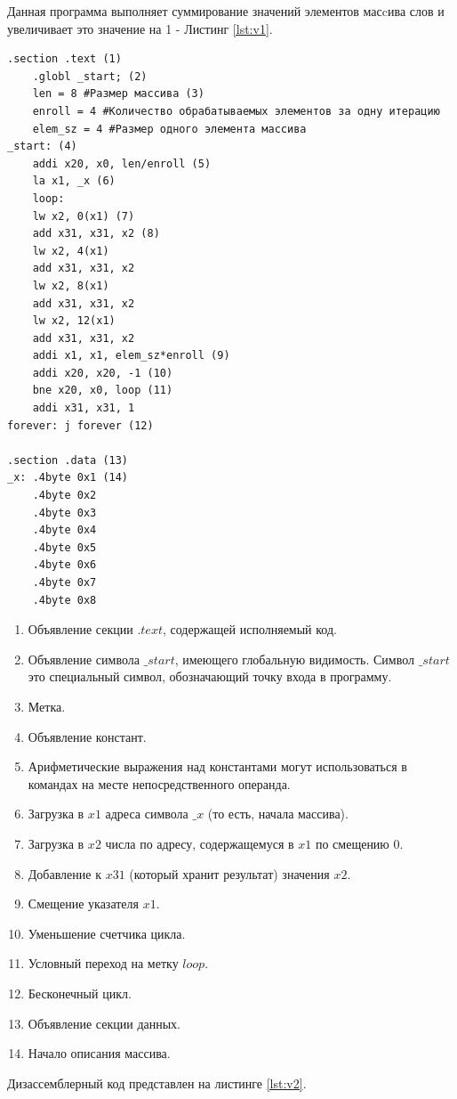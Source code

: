 Данная программа выполняет суммирование значений элементов масcива слов и увеличивает
это значение на 1 - Листинг \ref{lst:v1}.
\begin{lstlisting}[label=lst:v1,caption=Пример программы]
    .section .text (1)
	.globl _start; (2)
	len = 8 #Размер массива (3)
	enroll = 4 #Количество обрабатываемых элементов за одну итерацию
	elem_sz = 4 #Размер одного элемента массива
_start: (4)
	addi x20, x0, len/enroll (5)
	la x1, _x (6)
	loop:
	lw x2, 0(x1) (7)
	add x31, x31, x2 (8)
	lw x2, 4(x1)
	add x31, x31, x2
	lw x2, 8(x1)
	add x31, x31, x2
	lw x2, 12(x1)
	add x31, x31, x2
	addi x1, x1, elem_sz*enroll (9)
	addi x20, x20, -1 (10)
	bne x20, x0, loop (11)
	addi x31, x31, 1
forever: j forever (12)

.section .data (13)
_x: .4byte 0x1 (14)
	.4byte 0x2
	.4byte 0x3
	.4byte 0x4
	.4byte 0x5
	.4byte 0x6
	.4byte 0x7
	.4byte 0x8
\end{lstlisting}

\clearpage

\begin{enumerate}
	\item Объявление секции $.text$, содержащей исполняемый код.
	\item Объявление символа $\_start$, имеющего глобальную видимость. Символ $\_start$ это специальный символ, обозначающий точку входа в программу.
	\item Метка.
	\item Объявление констант.
	\item Арифметические выражения над константами могут использоваться в командах
	на месте непосредственного операнда.
	\item Загрузка в $x1$ адреса символа $\_x$ (то есть, начала массива).
	\item Загрузка в $x2$ числа по адресу, содержащемуся в $x1$ по смещению 0.
	\item Добавление к $x31$ (который хранит результат) значения $x2$.
	\item Смещение указателя $x1$.
	\item Уменьшение счетчика цикла.
	\item Условный переход на метку $loop$.
	\item Бесконечный цикл.
	\item Объявление секции данных.
	\item Начало описания массива.
\end{enumerate}

\clearpage

Дизассемблерный код представлен на листинге \ref{lst:v2}.

